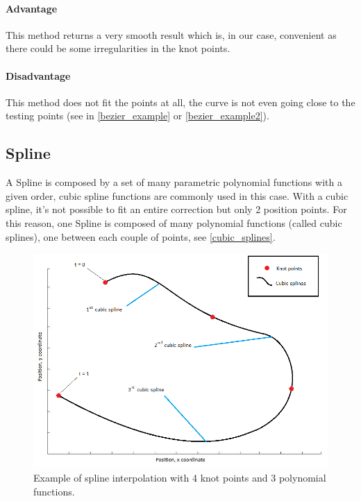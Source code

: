 \paragraph*{Advantage}

This method returns a very smooth result which is, in our case, convenient as there could be some irregularities in the knot points.

\paragraph*{Disadvantage}

This method does not fit the points at all, the curve is not even going close to the testing points (see in \autoref{bezier_example} or \autoref{bezier_example2}).

\clearpage
\subsection{Spline}

A Spline is composed by a set of many parametric polynomial functions with a given order, cubic spline functions are commonly used in this case. With a cubic spline, it's not possible to fit an entire correction but only 2 position points. For this reason, one Spline is composed of many polynomial functions (called cubic splines), one between each couple of points, see \autoref{cubic_splines}.

\begin{figure}[H]
\centering
\includegraphics[width=13cm]{img/cubic_splines.png}
\caption{Example of spline interpolation with 4 knot points and 3 polynomial functions.}
\label{cubic_splines}
\end{figure}

